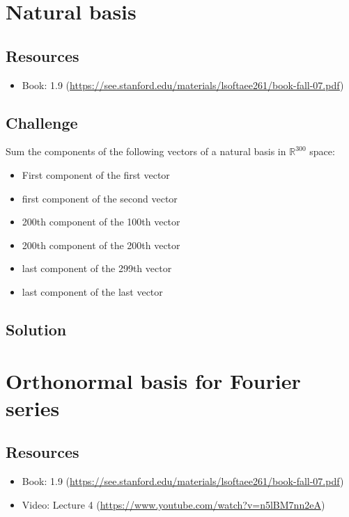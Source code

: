 \newpage
\section{Natural basis}

\subsection*{Resources}
\begin{itemize}
    \item Book: 1.9 (\url{https://see.stanford.edu/materials/lsoftaee261/book-fall-07.pdf})
\end{itemize}

\subsection*{Challenge}
Sum the components of the following vectors of a natural basis in $\mathbb{R}^{300}$ space:

\begin{itemize}
    \item First component of the first vector
    \item first component of the second vector
    \item 200th component of the 100th vector
    \item 200th component of the 200th vector
    \item last component of the 299th vector
    \item last component of the last vector
\end{itemize}

\subsection*{Solution}




\newpage
\section{Orthonormal basis for Fourier series}

\subsection*{Resources}
\begin{itemize}
    \item Book: 1.9 (\url{https://see.stanford.edu/materials/lsoftaee261/book-fall-07.pdf})
    \item Video: Lecture 4 (\url{https://www.youtube.com/watch?v=n5lBM7nn2eA})
\end{itemize}

